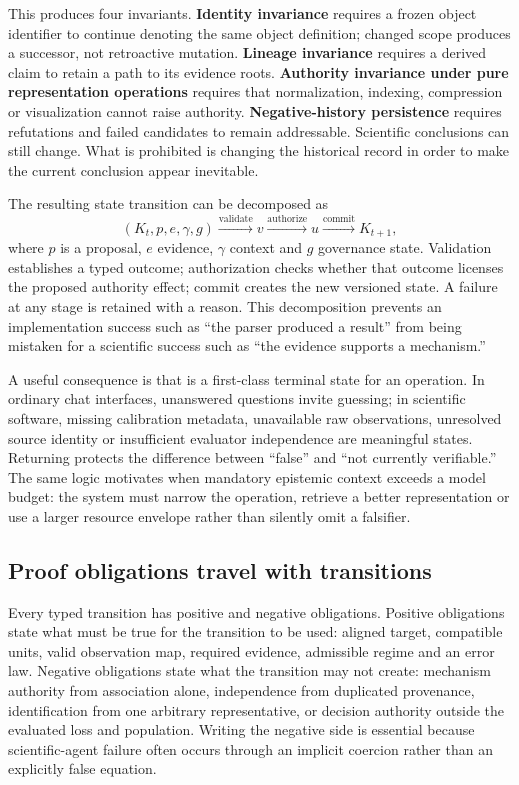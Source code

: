 This produces four invariants. \textbf{Identity invariance} requires a frozen object identifier to continue denoting the same object definition; changed scope produces a successor, not retroactive mutation. \textbf{Lineage invariance} requires a derived claim to retain a path to its evidence roots. \textbf{Authority invariance under pure representation operations} requires that normalization, indexing, compression or visualization cannot raise authority. \textbf{Negative-history persistence} requires refutations and failed candidates to remain addressable. Scientific conclusions can still change. What is prohibited is changing the historical record in order to make the current conclusion appear inevitable.

The resulting state transition can be decomposed as
\[
(K_t,p,e,\gamma,g)
\overset{\mathrm{validate}}{\longrightarrow}
v
\overset{\mathrm{authorize}}{\longrightarrow}
u
\overset{\mathrm{commit}}{\longrightarrow}
K_{t+1},
\]
where \(p\) is a proposal, \(e\) evidence, \(\gamma\) context and \(g\) governance state. Validation establishes a typed outcome; authorization checks whether that outcome licenses the proposed authority effect; commit creates the new versioned state. A failure at any stage is retained with a reason. This decomposition prevents an implementation success such as ``the parser produced a result'' from being mistaken for a scientific success such as ``the evidence supports a mechanism.''

A useful consequence is that \CannotCheck{} is a first-class terminal state for an operation. In ordinary chat interfaces, unanswered questions invite guessing; in scientific software, missing calibration metadata, unavailable raw observations, unresolved source identity or insufficient evaluator independence are meaningful states. Returning \CannotCheck{} protects the difference between ``false'' and ``not currently verifiable.'' The same logic motivates \CannotCompile{} when mandatory epistemic context exceeds a model budget: the system must narrow the operation, retrieve a better representation or use a larger resource envelope rather than silently omit a falsifier.

\subsection{Proof obligations travel with transitions}

Every typed transition has positive and negative obligations. Positive obligations state what must be true for the transition to be used: aligned target, compatible units, valid observation map, required evidence, admissible regime and an error law. Negative obligations state what the transition may not create: mechanism authority from association alone, independence from duplicated provenance, identification from one arbitrary representative, or decision authority outside the evaluated loss and population. Writing the negative side is essential because scientific-agent failure often occurs through an implicit coercion rather than an explicitly false equation.

